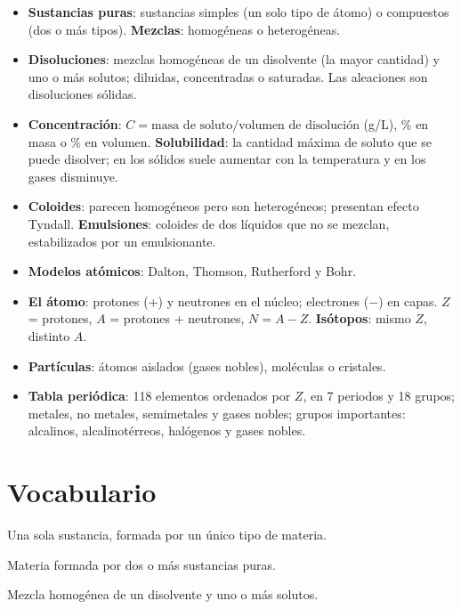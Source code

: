 \begin{itemize}
    \item \textbf{Sustancias puras}: sustancias simples (un solo tipo de átomo) o compuestos (dos o más tipos). \textbf{Mezclas}: homogéneas o heterogéneas.
    \item \textbf{Disoluciones}: mezclas homogéneas de un disolvente (la mayor cantidad) y uno o más solutos; diluidas, concentradas o saturadas. Las aleaciones son disoluciones sólidas.
    \item \textbf{Concentración}: \(C = \text{masa de soluto}/\text{volumen de disolución}\) (g/L), \% en masa o \% en volumen. \textbf{Solubilidad}: la cantidad máxima de soluto que se puede disolver; en los sólidos suele aumentar con la temperatura y en los gases disminuye.
    \item \textbf{Coloides}: parecen homogéneos pero son heterogéneos; presentan efecto Tyndall. \textbf{Emulsiones}: coloides de dos líquidos que no se mezclan, estabilizados por un emulsionante.
    \item \textbf{Modelos atómicos}: Dalton, Thomson, Rutherford y Bohr.
    \item \textbf{El átomo}: protones (+) y neutrones en el núcleo; electrones (\(-\)) en capas. \(Z\) = protones, \(A\) = protones + neutrones, \(N = A - Z\). \textbf{Isótopos}: mismo \(Z\), distinto \(A\).
    \item \textbf{Partículas}: átomos aislados (gases nobles), moléculas o cristales.
    \item \textbf{Tabla periódica}: 118 elementos ordenados por \(Z\), en 7 periodos y 18 grupos; metales, no metales, semimetales y gases nobles; grupos importantes: alcalinos, alcalinotérreos, halógenos y gases nobles.
\end{itemize}

\section{Vocabulario}

\begin{vocabulary}
    Una sola sustancia, formada por un único tipo de materia.
\end{vocabulary}

\begin{vocabulary}
    Materia formada por dos o más sustancias puras.
\end{vocabulary}

\begin{vocabulary}
    Mezcla homogénea de un disolvente y uno o más solutos.
\end{vocabulary}

